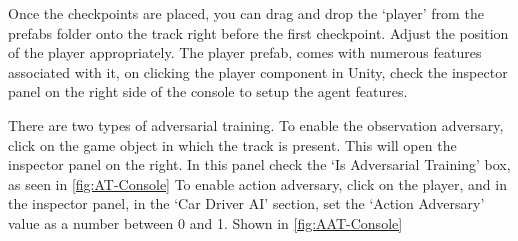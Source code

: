 Once the checkpoints are placed, you can drag and drop the `player' from the prefabs folder onto the track right before the first checkpoint. Adjust the position of the player appropriately. The player prefab, comes with numerous features associated with it, on clicking the player component in Unity, check the inspector panel on the right side of the console to setup the agent features.

There are two types of adversarial training. To enable the observation adversary, click on the game object in which the track is present. This will open the inspector panel on the right. In this panel check the `Is Adversarial Training' box, as seen in \ref{fig:AT-Console}
To enable action adversary, click on the player, and in the inspector panel, in the `Car Driver AI' section, set the `Action Adversary' value as a number between 0 and 1.
Shown in \ref{fig:AAT-Console}

